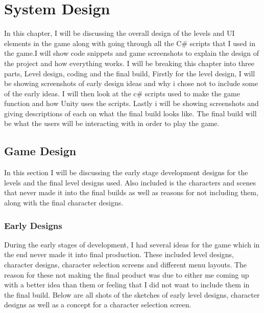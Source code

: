 \chapter{System Design}
In this chapter, I will be discussing the overall design of the levels and UI elements in the game along with going through all the C\# scripts that I used in the game.I will show code snippets and game screenshots to explain the design of the project and how everything works. I will be breaking this chapter into three parts, Level design, coding and the final build, Firstly for the level design, I will be showing screenshots of early design ideas and why i chose not to include some of the early ideas. I will then look at the  c\# scripts used to make the game function and how Unity uses the scripts. Lastly i will be showing screenshots and giving descriptions of each on what the final build looks like. The final build will be what the users will be interacting with in order to play the game.

\section{Game Design}
In this section I will be discussing the early stage development designs for the levels and the final level designs used. Also included is the characters and scenes that never made it into the final builds as well as reasons for not including them, along with the final character designs.

\subsection{Early Designs}
During the early stages of development, I had several ideas for the game which in the end never made it into final production. These included level designs, character designs, character selection screens and different menu layouts. The reason for these not making the final product was due to either me coming up with a better idea than them or feeling that I did not want to include them in the final build. Below are all shots of the sketches of early level designs, character designs as well as a concept for a character selection screen.

